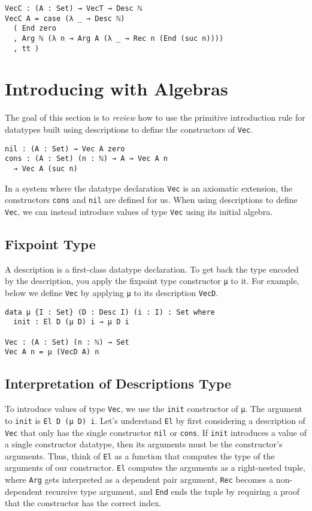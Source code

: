 \documentclass[nonatbib]{sigplanconf}
\begin{document}
\begin{verbatim}
VecC : (A : Set) → VecT → Desc ℕ
VecC A = case (λ _ → Desc ℕ)
  ( End zero
  , Arg ℕ (λ n → Arg A (λ _ → Rec n (End (suc n))))
  , tt )
\end{verbatim}

\section{Introducing with Algebras}
\label{sec:init}

The goal of this section is to {\it review} how to use the primitive
introduction rule for datatypes built using descriptions to define the
constructors of {\tt Vec}.

\begin{verbatim}
nil : (A : Set) → Vec A zero
cons : (A : Set) (n : ℕ) → A → Vec A n
  → Vec A (suc n)
\end{verbatim}

In a system where the datatype declaration {\tt Vec} is an axiomatic
extension, the constructors {\tt cons} and {\tt nil} are defined for
us. When using descriptions to define {\tt Vec}, we can instead
introduce values of type {\tt Vec} using its initial algebra.

\subsection{Fixpoint Type}

A description is a first-class datatype declaration. To get back the
type encoded by the description, you apply the fixpoint type
constructor {\tt μ} to it. For example, below we define {\tt Vec} by
applying {\tt μ} to its description {\tt VecD}.

\begin{verbatim}
data μ {I : Set} (D : Desc I) (i : I) : Set where
  init : El D (μ D) i → μ D i

Vec : (A : Set) (n : ℕ) → Set
Vec A n = μ (VecD A) n
\end{verbatim}

\subsection{Interpretation of Descriptions Type}
\label{sec:init:el}

To introduce values of type {\tt Vec}, we use the
{\tt init} constructor of {\tt μ}. The argument to {\tt init} is
{\tt El D (μ D) i}. Let's understand {\tt El} by first considering a
description of {\tt Vec} that only has the single constructor
{\tt nil} or {\tt cons}. If {\tt init} introduces
a value of a single constructor datatype, then its arguments must be
the constructor's arguments. Thus, think of
{\tt El} as a function that computes the type of the arguments of our
constructor. {\tt El} computes the arguments as a right-nested tuple,
where {\tt Arg} gets interpreted as a dependent pair argument,
{\tt Rec} becomes a non-dependent recursive type argument, and
{\tt End} ends the tuple by requiring a proof that the constructor has
the correct index.
\end{document}
